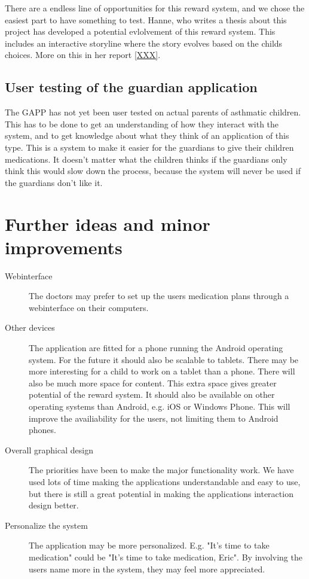 There are a endless line of opportunities for this reward system, and we chose the easiest part to have something to test. Hanne, who writes a thesis about this project has developed a potential evlolvement of this reward system. This includes an interactive storyline where the story evolves based on the childs choices. More on this in her report \ref{XXX}. 

\subsection{User testing of the guardian application}
The GAPP has not yet been user tested on actual parents of asthmatic children. This has to be done to get an understanding of how they interact with the system, and to get knowledge about what they think of an application of this type. This is a system to make it easier for the guardians to give their children medications. It doesn't matter what the children thinks if the guardians only think this would slow down the process, because the system will never be used if the guardians don't like it.


\section{Further ideas and minor improvements}


\begin{description}

\item[Webinterface] The doctors may prefer to set up the users medication plans through a webinterface on their computers. 

\item[Other devices] The application are fitted for a phone running the Android operating system. For the future it should also be scalable to tablets. There may be more interesting for a child to work on a tablet than a phone. There will also be much more space for content. This extra space gives greater potential of the reward system. It should also be available on other operating systems than Android, e.g. iOS or Windows Phone. This will improve the availiability for the users, not limiting them to Android phones. 

\item[Overall graphical design] The priorities have been to make the major functionality work. We have used lots of time making the applications understandable and easy to use, but there is still a great potential in making the applications interaction design better. 

\item[Personalize the system] The application may be more personalized. E.g. "It's time to take medication" could be "It's time to take medication, Eric". By involving the users name more in the system, they may feel more appreciated. 

\end{description}